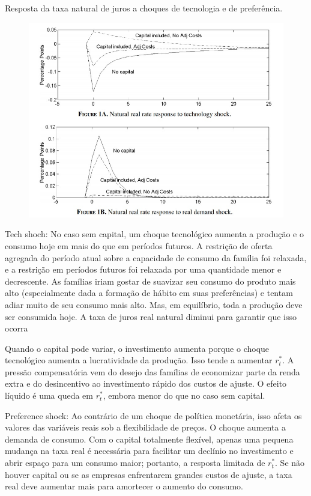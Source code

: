 Resposta da taxa natural de juros a choques de tecnologia e de preferência.
\begin{figure}[H]
\centering
\includegraphics[scale=0.60]{Figuras/Figura Neiss.jpg}
\end{figure}

Tech shoch: No caso sem capital, um choque tecnológico aumenta a produção e o consumo hoje em mais do que em períodos futuros. A restrição de oferta agregada do período atual sobre a capacidade de consumo da família foi relaxada, e a restrição em períodos futuros foi relaxada por uma quantidade menor e decrescente. As famílias iriam gostar de suavizar seu consumo do produto mais alto (especialmente dada a formação de hábito em suas preferências) e tentam adiar muito de seu consumo mais alto. Mas, em equilíbrio, toda a produção deve ser consumida hoje. A taxa de juros real natural diminui para garantir que isso ocorra

Quando o capital pode variar, o investimento aumenta porque o choque tecnológico aumenta a lucratividade da produção. Isso tende a aumentar $r_t^{*}$. A pressão compensatória vem do desejo das famílias de economizar parte da renda extra e do desincentivo ao investimento rápido dos custos de ajuste. O efeito líquido é uma queda em $r_t^{*}$, embora menor do que no caso sem capital.

Preference shock: Ao contrário de um choque de política monetária, isso afeta os valores das variáveis reais sob a flexibilidade de preços. O choque aumenta a demanda de consumo. Com o capital totalmente flexível, apenas uma pequena mudança na taxa real é necessária para facilitar um declínio no investimento e abrir espaço para um consumo maior; portanto, a resposta limitada de $r_t^{*}$. Se não houver capital ou se as empresas enfrentarem grandes custos de ajuste, a taxa real deve aumentar mais para amortecer o aumento do consumo.


